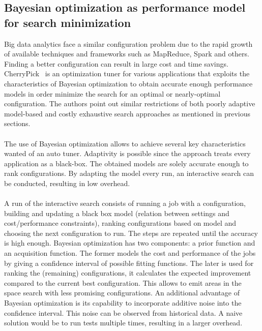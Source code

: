 \subsection{Bayesian optimization as performance model for search minimization}
\label{rw:cherry}
Big data analytics face a similar configuration problem due to the rapid growth of available techniques and frameworks such as MapReduce, Spark and others. Finding a better configuration can result in large cost and time savings. CherryPick~\cite{alipourfard2017cherrypick} is an optimization tuner for various applications that exploits the characteristics of Bayesian optimization to obtain accurate enough performance models in order minimize the search for an optimal or nearly-optimal configuration. The authors point out similar restrictions of both poorly adaptive model-based and costly exhaustive search approaches as mentioned in  previous sections.\\\\
The use of Bayesian optimization allows to achieve several key characteristics wanted of an auto tuner. Adaptivity is possible since the approach treats every application as a black-box. The obtained models are solely accurate enough to rank configurations. By adapting the model every run, an interactive search can be conducted, resulting in low overhead.~\cite{alipourfard2017cherrypick} \\\\
A run of the interactive search consists of running a job with a configuration, building and updating a black box model (relation between settings and cost/performance constraints), ranking configurations based on model and choosing the next configuration to run. The steps are repeated until the accuracy is high enough. Bayesian optimization has two components: a prior function and an acquisition function. The former models the cost and performance of the jobs by giving a confidence interval of possible fitting functions. The later is used for ranking the (remaining) configurations, it calculates the expected improvement compared to the current best configuration. This allows to emit areas in the space search with less promising configurations. An additional advantage of Bayesian optimization is its capability to incorporate additive noise into the confidence interval. This noise can be observed from historical data. A naive solution would be to run tests multiple times, resulting in a larger overhead.~\cite{alipourfard2017cherrypick} 
 
